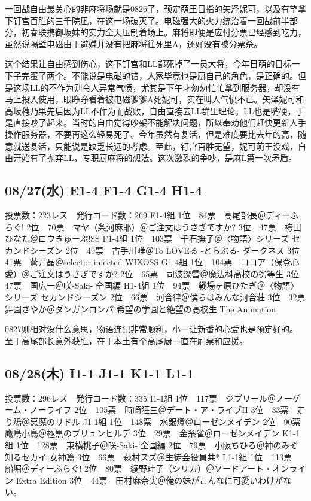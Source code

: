 一回战自由最关心的非麻将场就是0826了，预定萌王目指的矢泽妮可，以及有望拿下钉宫百胜的三千院凪，在这一场破灭了。电磁强大的火力统治着一回战前半部分，初春联携御坂妹的实力全天压制着场上。麻将即便是应付分票已经感到吃力，虽然说隔壁电磁由于避嫌并没有把麻将往死里A，还好没有被分票杀。

这个结果让自由感到伤心，这下钉宫和LL都死掉了一员大将，今年日萌的目标一下子完蛋了两个。不能说是电磁的错，人家毕竟也是厨自己的角色，是正确的。但是这场LL的不作为则令人异常气愤，尤其是下午才匆匆忙忙拿到服务器，却没有马上投入使用，眼睁睁看着被电磁爹爹A死妮可，实在叫人气愤不已。矢泽妮可和高坂穗乃果先后因为LL不作为而战败，自由直接去LL群里理论。LL也是嘴硬，于是直接吵了起来。当时的自由觉得吵架不能解决问题，所以奉劝他们赶快更新人手操作服务器，不要再这么轻易死了。今年虽然有复活，但是难度要比去年的高，随意就送复活，只能说是缺乏长远的考虑。至此，钉宫百胜无望，妮可萌王没戏，自由开始有了抛弃LL，专职厨麻将的想法。这次激烈的争吵，是麻L第一次矛盾。

\subsection{08/27(水) E1-4 F1-4 G1-4 H1-4}

	投票数：223レス　発行コード数：269
	E1-4組
	1位　84票　高尾部長＠ディーふらぐ!
	2位　70票　マヤ（条河麻耶）＠ご注文はうさぎですか?
	3位　47票　袴田ひなた＠ロウきゅーぶ!SS
	F1-4組
	1位　103票　千石撫子＠〈物語〉シリーズ セカンドシーズン
	2位　49票　古手川唯＠To LOVEる -とらぶる- ダークネス
	3位　41票　蒼井晶＠selector infected WIXOSS
	G1-4組
	1位　104票　ココア（保登心愛）＠ご注文はうさぎですか?
	2位　65票　司波深雪＠魔法科高校の劣等生
	3位　47票　国広一＠咲-Saki- 全国編
	H1-4組
	1位　94票　戦場ヶ原ひたぎ＠〈物語〉シリーズ セカンドシーズン
	2位　66票　河合律＠僕らはみんな河合荘
	3位　32票　舞園さやか＠ダンガンロンパ 希望の学園と絶望の高校生 The Animation

0827则相对没什么意思，物语连记非常顺利，小一让新番的心爱也是预定好的。
至于高尾部长意外获胜，在于本土有个高尾厨一直在刷票和应援。

\subsection{08/28(木) I1-1 J1-1 K1-1 L1-1}

	投票数：296レス　発行コード数：335
	I1-1組
	1位　117票　ジブリール＠ノーゲーム・ノーライフ
	2位　105票　時崎狂三＠デート・ア・ライブII
	3位　33票　走り鳰＠悪魔のリドル
	J1-1組
	1位　148票　水銀燈＠ローゼンメイデン
	2位　90票　鷹鳥小鳥＠極黒のブリュンヒルデ
	3位　29票　金糸雀＠ローゼンメイデン
	K1-1組
	1位　128票　東横桃子＠咲-Saki- 全国編
	2位　79票　小阪ちひろ＠神のみぞ知るセカイ 女神篇
	3位　66票　萩村スズ＠生徒会役員共*
	L1-1組
	1位　113票　船堀＠ディーふらぐ!
	2位　80票　綾野珪子（シリカ）＠ソードアート・オンライン Extra Edition
	3位　44票　田村麻奈実＠俺の妹がこんなに可愛いわけがない。

